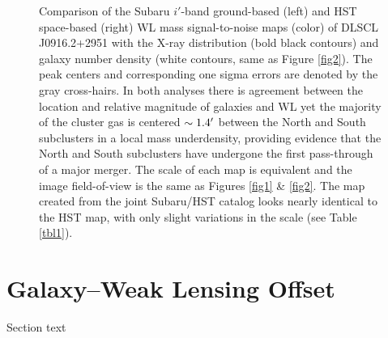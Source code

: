\begin{figure}
\caption[Comparison of the Subaru $i'$-band ground-based and HST space-based WL mass signal-to-noise maps of DLSCL J0916.2+2951 with the X-ray distribution and galaxy number density.]{Comparison of the Subaru $i'$-band ground-based (left) and HST space-based (right) WL mass signal-to-noise maps (color) of DLSCL J0916.2+2951 with the X-ray distribution (bold black contours) and galaxy number density (white contours, same as Figure \ref{fig2}). The peak centers and corresponding one sigma errors are denoted by the gray cross-hairs.
In both analyses there is agreement between the location and relative magnitude of galaxies and WL yet the majority of the cluster gas is centered $\sim1.4\mbox{$^\prime$}$ between the North and South subclusters in a local mass underdensity, providing evidence that the North and South subclusters have undergone the first pass-through of a major merger.
The scale of each map is equivalent and the image field-of-view is the same as Figures \ref{fig1} \& \ref{fig2}.
The map created from the joint Subaru/HST catalog looks nearly identical to the HST map, with only slight variations in the scale (see Table \ref{tbl1}).
\label{fig3}}
\end{figure}

\section{Galaxy--Weak Lensing Offset}

Section text

